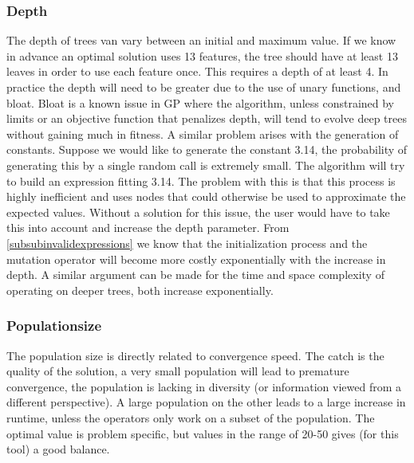 \subsubsection{Depth}
The depth of trees van vary between an initial and maximum value. If we know in advance an optimal solution uses 13 features, the tree should have at least 13 leaves in order to use each feature once. This requires a depth of at least 4. In practice the depth will need to be greater due to the use of unary functions, and bloat. Bloat is a known issue in GP %
where the algorithm, unless constrained by limits or an objective function that penalizes depth, will tend to evolve deep trees without gaining much in fitness.
A similar problem arises with the generation of constants. Suppose we would like to generate the constant 3.14, the probability of generating this by a single random call is extremely small. The algorithm will try to build an expression fitting 3.14. The problem with this is that this process is highly inefficient and uses nodes that could otherwise be used to approximate the expected values. 
Without a solution for this issue, the user would have to take this into account and increase the depth parameter. 
From \ref{subsubinvalidexpressions} we know that the initialization process and the mutation operator will become more costly exponentially with the increase in depth.
A similar argument can be made for the time and space complexity of operating on deeper trees, both increase exponentially.

\subsubsection{Populationsize}
The population size is directly related to convergence speed. The catch is the quality of the solution, a very small population will lead to premature convergence, the population is lacking in diversity (or information viewed from a different perspective).
A large population on the other leads to a large increase in runtime, unless the operators only work on a subset of the population. The optimal value is problem specific, but values in the range of 20-50 gives (for this tool) a good balance.

